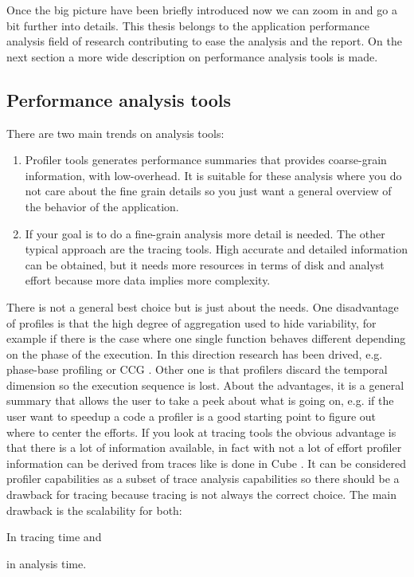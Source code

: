 Once the big picture have been briefly introduced now we can zoom in and go a
bit further into details. This thesis belongs to the application performance 
analysis field of research contributing to ease the analysis and the report. 
On the next section a more wide description on performance analysis tools is made.

\subsection{Performance analysis tools}

There are two main trends on analysis tools:
\begin{enumerate}[label=\roman*)]
    \item Profiler tools 
      generates performance summaries that provides coarse-grain information, 
      with low-overhead. It is suitable for these analysis where you do not care
      about the fine grain details so you just want a general overview of the
      behavior of the application.
    \item If your goal is to do a fine-grain analysis more detail is needed. The 
      other typical approach are the tracing tools. High accurate and detailed 
      information can be obtained, but it needs more resources in terms of disk 
      and analyst effort because more data implies more complexity.
\end{enumerate}
There is not a general best choice but is just about the needs. One
disadvantage of profiles is that the high degree of aggregation used to hide
variability, for example if there is the case where one single function
behaves different depending on the phase of the execution. In this direction
research has been drived, e.g. phase-base profiling \cite{malony2005phase} or
CCG \cite{knupfer2005construction}. Other one is
that profilers discard the temporal dimension so the execution sequence is lost.
About the advantages, it is a general summary that allows the user to take a
peek about what is going on, e.g. if the user want to speedup a code a profiler
is a good starting point to figure out where to center the efforts. If you look
at tracing tools the obvious advantage is that there is a lot of information
available, in fact with not a lot of effort profiler information can be derived
from traces like is done in Cube \cite{saviankou2015cube}. It can be considered
profiler capabilities as a subset of trace analysis capabilities so there should
be a drawback for tracing because tracing is not always the correct choice. The
main drawback is the scalability for both:
\begin{enumerate*}[label=\roman*)]
  \item In tracing time and
  \item in analysis time.
\end{enumerate*}

